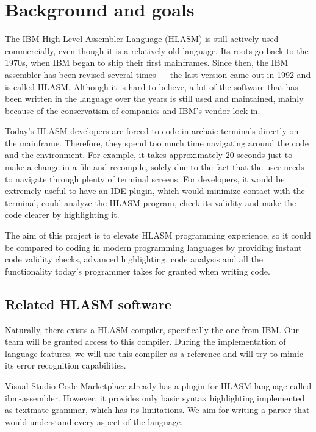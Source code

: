 \chapter{Background and goals}


The IBM High Level Assembler Language (HLASM) is still actively used commercially, even though it is a relatively old language. Its roots go back to the 1970s, when IBM began to ship their first mainframes. Since then, the IBM assembler has been revised several times --- the last version came out in 1992 and is called HLASM. Although it is hard to believe, a lot of the software that has been written in the language over the years is still used and maintained, mainly because of the conservatism of companies and IBM's vendor lock-in.

Today's HLASM developers are forced to code in archaic terminals directly on the mainframe. Therefore, they spend too much time navigating around the code and the environment. For example, it takes approximately 20 seconds just to make a change in a file and recompile, solely due to the fact that the user needs to navigate through plenty of terminal screens. For developers, it would be extremely useful to have an IDE plugin, which would minimize contact with the terminal, could analyze the HLASM program, check its validity and make the code clearer by highlighting it. 

The aim of this project is to elevate HLASM programming experience, so it could be compared to coding in modern programming languages by providing instant code validity checks, advanced highlighting, code analysis and all the functionality today's programmer takes for granted when writing code.

\section{Related HLASM software}
Naturally, there exists a HLASM compiler\footnotemark, specifically the one from IBM. Our team will be granted access to this compiler. During the implementation of language features, we will use this compiler as a reference and will try to mimic its error recognition capabilities.

Visual Studio Code Marketplace already has a plugin for HLASM language called ibm\nobreakdash-assembler\footnotemark. However, it provides only basic syntax highlighting implemented as textmate grammar, which has its limitations. We aim for writing a parser that would understand every aspect of the language.
